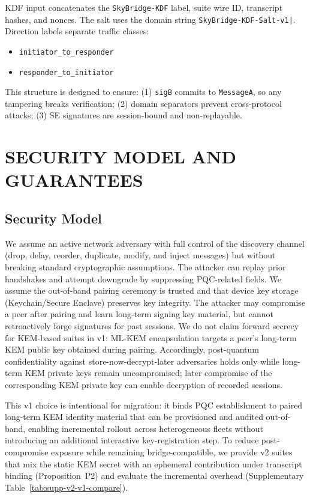 \documentclass[10pt,journal,compsoc]{IEEEtran}
\begin{document}
KDF input concatenates the \texttt{SkyBridge-KDF} label, suite wire ID,
transcript hashes, and nonces. The salt uses the domain string
\texttt{SkyBridge-KDF-Salt-v1|}. Direction labels separate traffic
classes:
\begin{itemize}
\item \texttt{initiator\_to\_responder}
\item \texttt{responder\_to\_initiator}
\end{itemize}


This structure is designed to ensure: (1) \texttt{sigB} commits to \texttt{MessageA},
so any tampering breaks verification; (2) domain separators prevent
cross-protocol attacks; (3) SE signatures are session-bound and
non-replayable.



\section{SECURITY MODEL AND
GUARANTEES}\label{sec:security-model}

\subsection{Security Model}\label{a.-security-model}

We assume an active network adversary with full control of the discovery
channel (drop, delay, reorder, duplicate, modify, and inject messages)
but without breaking standard cryptographic assumptions. The attacker
can replay prior handshakes and attempt downgrade by suppressing
PQC-related fields. We assume the out-of-band pairing ceremony is
trusted and that device key storage (Keychain/Secure Enclave) preserves
key integrity. The attacker may compromise a peer after pairing and
learn long-term signing key material, but cannot retroactively forge
signatures for past sessions. We do not claim forward secrecy for
KEM-based suites in v1: ML-KEM encapsulation targets a peer's long-term
KEM public key obtained during pairing. Accordingly, post-quantum
confidentiality against store-now-decrypt-later adversaries holds only
while long-term KEM private keys remain uncompromised; later compromise
of the corresponding KEM private key can enable decryption of recorded
sessions.

This v1 choice is intentional for migration: it binds PQC establishment
to paired long-term KEM identity material that can be provisioned and
audited out-of-band, enabling incremental rollout across heterogeneous
fleets without introducing an additional interactive key-registration
step. To reduce post-compromise exposure while remaining
bridge-compatible, we provide v2 suites that mix the static KEM secret
with an ephemeral contribution under transcript binding
(Proposition~P2) and evaluate the incremental overhead (Supplementary
Table~\ref{tab:supp-v2-v1-compare}).
\end{document}
